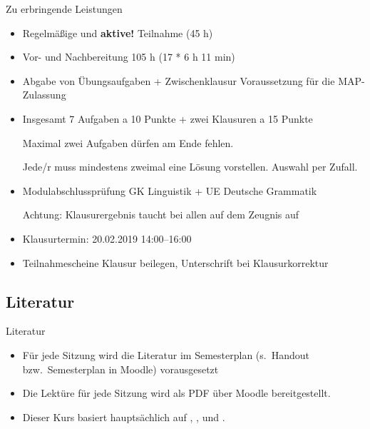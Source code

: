 \begin{frame}{Zu erbringende Leistungen}

	\begin{itemize}
	\item Regelmäßige und \textbf{aktive!} Teilnahme (45 h)
        \item Vor- und Nachbereitung 105 h (17 * 6 h 11 min)
	\item Abgabe von Übungsaufgaben + Zwischenklausur \ras Voraussetzung für die MAP-Zulassung

        \item Insgesamt 7 Aufgaben a 10 Punkte + zwei Klausuren a 15 Punkte

              Maximal zwei Aufgaben dürfen am Ende fehlen.

              Jede/r muss mindestens zweimal eine Lösung vorstellen. Auswahl per Zufall.

	\item Modulabschlussprüfung \ras GK Linguistik + UE Deutsche Grammatik

              Achtung: Klausurergebnis taucht bei allen auf dem Zeugnis auf

        \item Klausurtermin: 20.02.2019 14:00--16:00
        \item Teilnahmescheine Klausur beilegen, Unterschrift bei Klausurkorrektur
              
	\end{itemize}
	
\end{frame}


%
\subsection{Literatur}

\begin{frame}{Literatur}

\begin{itemize}
	\item Für jede Sitzung wird die Literatur im Semesterplan (s.\ Handout bzw.\ Semesterplan in Moodle) vorausgesetzt
	\item Die Lektüre für jede Sitzung wird als PDF über Moodle bereitgestellt.
\bigskip

	\item Dieser Kurs basiert hauptsächlich auf , ,  und .
\end{itemize}		

\end{frame}

